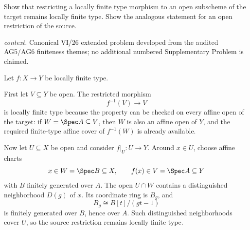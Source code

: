 \begin{problem}\label{prob:vi26-p06}
Show that restricting a locally finite type morphism to an open subscheme of the target remains locally finite type.  Show the analogous statement for an open restriction of the source.
\par\smallskip\noindent\textit{context.} Canonical VI/26 extended problem developed from the audited AG5/AG6 finiteness themes; no additional numbered Supplementary Problem is claimed.
\end{problem}

\ifdefined\FullProblemDossiers
\begin{solution}
Let \(f:X\to Y\) be locally finite type.

First let \(V\subseteq Y\) be open.  The restricted morphism
\[
f^{-1}(V)\longrightarrow V
\]
is locally finite type because the property can be checked on every affine open of the target:
if \(W=\Spec A\subseteq V\), then \(W\) is also an affine open of \(Y\), and the required
finite-type affine cover of \(f^{-1}(W)\) is already available.

Now let \(U\subseteq X\) be open and consider \(f|_U:U\to Y\).  Around \(x\in U\), choose affine
charts
\[
x\in W=\Spec B\subseteq X,\qquad f(x)\in V=\Spec A\subseteq Y
\]
with \(B\) finitely generated over \(A\).  The open \(U\cap W\) contains a distinguished
neighborhood \(D(g)\) of \(x\).  Its coordinate ring is \(B_g\), and
\[
B_g\cong B[t]/(gt-1)
\]
is finitely generated over \(B\), hence over \(A\).  Such distinguished neighborhoods cover \(U\),
so the source restriction remains locally finite type.
\end{solution}
\fi
